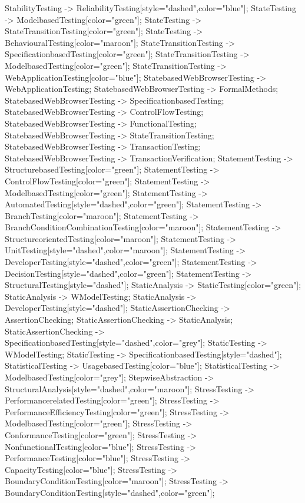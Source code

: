 \documentclass{article}
\begin{document}
{StabilityTesting -> ReliabilityTesting[style="dashed",color="blue"];
StateTesting -> ModelbasedTesting[color="green"];
StateTesting -> StateTransitionTesting[color="green"];
StateTesting -> BehaviouralTesting[color="maroon"];
StateTransitionTesting -> SpecificationbasedTesting[color="green"];
StateTransitionTesting -> ModelbasedTesting[color="green"];
StateTransitionTesting -> WebApplicationTesting[color="blue"];
StatebasedWebBrowserTesting -> WebApplicationTesting;
StatebasedWebBrowserTesting -> FormalMethods;
StatebasedWebBrowserTesting -> SpecificationbasedTesting;
StatebasedWebBrowserTesting -> ControlFlowTesting;
StatebasedWebBrowserTesting -> FunctionalTesting;
StatebasedWebBrowserTesting -> StateTransitionTesting;
StatebasedWebBrowserTesting -> TransactionTesting;
StatebasedWebBrowserTesting -> TransactionVerification;
StatementTesting -> StructurebasedTesting[color="green"];
StatementTesting -> ControlFlowTesting[color="green"];
StatementTesting -> ModelbasedTesting[color="green"];
StatementTesting -> AutomatedTesting[style="dashed",color="green"];
StatementTesting -> BranchTesting[color="maroon"];
StatementTesting -> BranchConditionCombinationTesting[color="maroon"];
StatementTesting -> StructureorientedTesting[color="maroon"];
StatementTesting -> UnitTesting[style="dashed",color="maroon"];
StatementTesting -> DeveloperTesting[style="dashed",color="green"];
StatementTesting -> DecisionTesting[style="dashed",color="green"];
StatementTesting -> StructuralTesting[style="dashed"];
StaticAnalysis -> StaticTesting[color="green"];
StaticAnalysis -> WModelTesting;
StaticAnalysis -> DeveloperTesting[style="dashed"];
StaticAssertionChecking -> AssertionChecking;
StaticAssertionChecking -> StaticAnalysis;
StaticAssertionChecking -> SpecificationbasedTesting[style="dashed",color="grey"];
StaticTesting -> WModelTesting;
StaticTesting -> SpecificationbasedTesting[style="dashed"];
StatisticalTesting -> UsagebasedTesting[color="blue"];
StatisticalTesting -> ModelbasedTesting[color="grey"];
StepwiseAbstraction -> StructuralAnalysis[style="dashed",color="maroon"];
StressTesting -> PerformancerelatedTesting[color="green"];
StressTesting -> PerformanceEfficiencyTesting[color="green"];
StressTesting -> ModelbasedTesting[color="green"];
StressTesting -> ConformanceTesting[color="green"];
StressTesting -> NonfunctionalTesting[color="blue"];
StressTesting -> PerformanceTesting[color="blue"];
StressTesting -> CapacityTesting[color="blue"];
StressTesting -> BoundaryConditionTesting[color="maroon"];
StressTesting -> BoundaryConditionTesting[style="dashed",color="green"];
}
\end{document}
